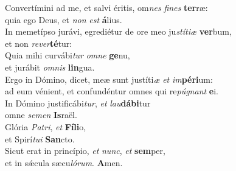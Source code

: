 \evenverse Convertímini ad me, et salvi éritis, om\textit{nes} \textit{fi}\textit{nes} \textbf{ter}ræ:~\*\\
\evenverse quia ego Deus, et \textit{non} \textit{est} \textbf{á}lius.\\
\oddverse In memetípso jurávi, egrediétur de ore meo ju\textit{stí}\textit{ti}\textit{æ} \textbf{ver}bum,~\*\\
\oddverse et non \textit{re}\textit{ver}\textbf{té}tur:\\
\evenverse Quia mihi curvábi\textit{tur} \textit{om}\textit{ne} \textbf{ge}nu,~\*\\
\evenverse et jurábit \textit{om}\textit{nis} \textbf{lin}gua.\\
\oddverse Ergo in Dómino, dicet, meæ sunt justíti\textit{æ} \textit{et} \textit{im}\textbf{pé}\textbf{ri}um:~\*\\
\oddverse ad eum vénient, et confundéntur omnes qui re\textit{pú}\textit{gnant} \textbf{e}i.\\
\evenverse In Dómino justificábi\textit{tur}, \textit{et} \textit{lau}\textbf{dá}\textbf{bi}tur~\*\\
\evenverse omne \textit{se}\textit{men} \textbf{Is}raël.\\
\oddverse Glória \textit{Pa}\textit{tri}, \textit{et} \textbf{Fí}\textbf{li}o,~\*\\
\oddverse et Spirí\textit{tu}\textit{i} \textbf{San}cto.\\
\evenverse Sicut erat in princípio, \textit{et} \textit{nunc}, \textit{et} \textbf{sem}per,~\*\\
\evenverse et in sǽcula sæcu\textit{ló}\textit{rum}. \textbf{A}men.\\
